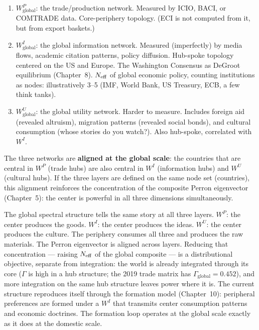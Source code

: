 \documentclass[../structural_economics_book.tex]{subfiles}
\begin{document}
\begin{remark}\label{ch16:prop:three_global}
\begin{enumerate}
\item $W^P_{\text{global}}$: the trade/production network. Measured by ICIO, BACI, or COMTRADE data. Core-periphery topology. (ECI is not computed from it, but from export baskets.)

\item $W^I_{\text{global}}$: the global information network. Measured (imperfectly) by media flows, academic citation patterns, policy diffusion. Hub-spoke topology centered on the US and Europe. The Washington Consensus as DeGroot equilibrium (Chapter~8). $N_{\text{eff}}$ of global economic policy, counting institutions as nodes: illustratively 3--5 (IMF, World Bank, US Treasury, ECB, a few think tanks).

\item $W^U_{\text{global}}$: the global utility network. Harder to measure. Includes foreign aid (revealed altruism), migration patterns (revealed social bonds), and cultural consumption (whose stories do you watch?). Also hub-spoke, correlated with $W^I$.
\end{enumerate}

The three networks are \textbf{aligned at the global scale}: the countries that are central in $W^P$ (trade hubs) are also central in $W^I$ (information hubs) and $W^U$ (cultural hubs). If the three layers are defined on the same node set (countries), this alignment reinforces the concentration of the composite Perron eigenvector (Chapter~5): the center is powerful in all three dimensions simultaneously.
\end{remark}

\begin{keyinsight}
The global spectral structure tells the same story at all three layers. $W^P$: the center produces the goods. $W^I$: the center produces the ideas. $W^U$: the center produces the culture. The periphery consumes all three and produces the raw materials. The Perron eigenvector is aligned across layers. Reducing that concentration --- raising $N_{\text{eff}}$ of the global composite --- is a distributional objective, separate from integration: the world is already integrated through its core ($\Gamma$ is high in a hub structure; the 2019 trade matrix has $\Gamma_{\text{global}} = 0.452$), and more integration on the same hub structure leaves power where it is. The current structure reproduces itself through the formation model (Chapter~10): peripheral preferences are formed under a $W^I$ that transmits center consumption patterns and economic doctrines. The formation loop operates at the global scale exactly as it does at the domestic scale.
\end{keyinsight}
\end{document}
